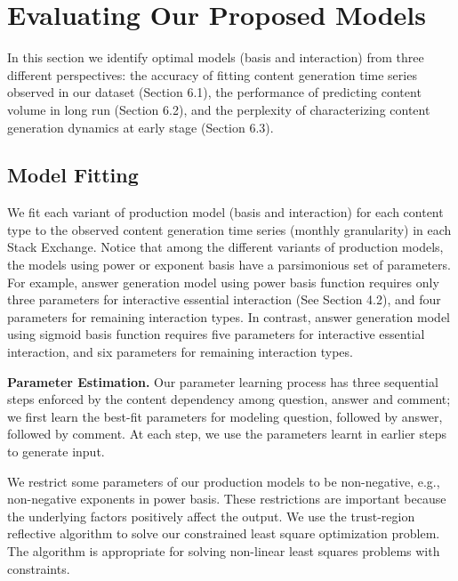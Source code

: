\section{Evaluating Our Proposed Models}
In this section we identify optimal models (basis and interaction) from three different perspectives: the accuracy of fitting content generation time series observed in our dataset (Section 6.1), the performance of predicting content volume in long run (Section 6.2), and the perplexity of characterizing content generation dynamics at early stage (Section 6.3).

\subsection{Model Fitting}
We fit each variant of production model (basis and interaction) for each content type to the observed content generation time series (monthly granularity) in each Stack Exchange. Notice that among the different variants of production models, the models using power or exponent basis have a parsimonious set of parameters. For example, answer generation model using power basis function requires only three parameters for interactive essential interaction (See Section 4.2), and four parameters for remaining interaction types. In contrast, answer generation model using sigmoid basis function requires five parameters for interactive essential interaction, and six parameters for remaining interaction types. 

\textbf{Parameter Estimation.} Our parameter learning process has three sequential steps enforced by the content dependency among question, answer and comment; we first learn the best-fit parameters for modeling question, followed by answer, followed by comment. At each step, we use the parameters learnt in earlier steps to generate input.

We restrict some parameters of our production models to be non-negative, e.g., non-negative exponents in power basis. These restrictions are important because the underlying factors positively affect the output. We use the trust-region reflective algorithm to solve our constrained least square optimization problem. The algorithm is appropriate for solving non-linear least squares problems with constraints.

